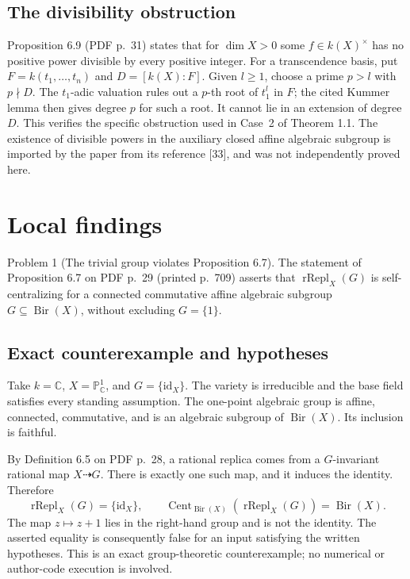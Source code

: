 \documentclass[10pt]{article}
\begin{document}
\subsection*{The divisibility obstruction}
Proposition 6.9 (PDF p. 31) states that for \(\dim X>0\) some \(f\in k(X)^\times\) has no positive power divisible by every positive integer. For a transcendence basis, put \(F=k(t_1,\ldots,t_n)\) and \(D=[k(X):F]\). Given \(l\ge1\), choose a prime \(p>l\) with \(p\nmid D\). The \(t_1\)-adic valuation rules out a \(p\)-th root of \(t_1^l\) in \(F\); the cited Kummer lemma then gives degree \(p\) for such a root. It cannot lie in an extension of degree \(D\). This verifies the specific obstruction used in Case 2 of Theorem 1.1. The existence of divisible powers in the auxiliary closed affine algebraic subgroup is imported by the paper from its reference [33], and was not independently proved here.\par
\section*{Local findings}
Problem 1 (The trivial group violates Proposition 6.7).  The statement of Proposition 6.7 on PDF p. 29 (printed p. 709) asserts that \(\operatorname{rRepl}_X(G)\) is self-centralizing for a connected commutative affine algebraic subgroup \(G\subseteq\operatorname{Bir}(X)\), without excluding \(G=\{1\}\).\par
\subsection*{Exact counterexample and hypotheses}
Take \(k=\mathbb C\), \(X=\mathbb P^1_{\mathbb C}\), and \(G=\{\mathrm{id}_X\}\). The variety is irreducible and the base field satisfies every standing assumption. The one-point algebraic group is affine, connected, commutative, and is an algebraic subgroup of \(\operatorname{Bir}(X)\). Its inclusion is faithful.\par
By Definition 6.5 on PDF p. 28, a rational replica comes from a \(G\)-invariant rational map \(X\dashrightarrow G\). There is exactly one such map, and it induces the identity. Therefore \[\operatorname{rRepl}_X(G)=\{\mathrm{id}_X\},\qquad
 \operatorname{Cent}_{\operatorname{Bir}(X)}(\operatorname{rRepl}_X(G))=\operatorname{Bir}(X).\] The map \(z\mapsto z+1\) lies in the right-hand group and is not the identity. The asserted equality is consequently false for an input satisfying the written hypotheses. This is an exact group-theoretic counterexample; no numerical or author-code execution is involved.\par
\end{document}
